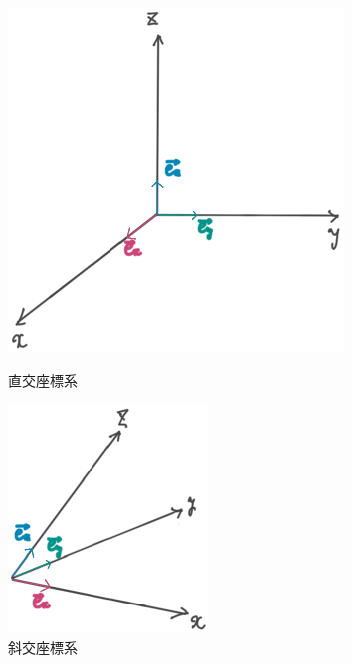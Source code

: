 \documentclass[dvipdfmx,a4]{jsarticle}
\begin{document}
\begin{figure}[htbp]
  \centering
  \begin{minipage}{0.3\columnwidth}
  \centering
  \includegraphics[width=\columnwidth]{fig/cartecian.pdf}
  \caption{直交座標系}
    \label{car}
  \end{minipage}
  \begin{minipage}{0.25\columnwidth}
  \centering
  \includegraphics[width=\columnwidth]{fig/oblique.pdf}
  \caption{斜交座標系}
  \label{obl}
  \end{minipage}
\end{figure}
\end{document}
